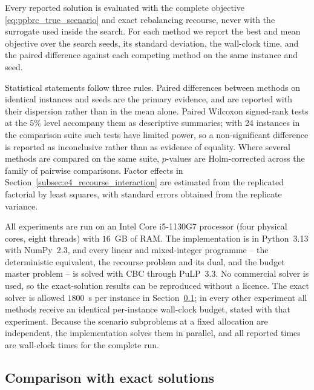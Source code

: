 \documentclass[authoryear,final,3p,times]{elsarticle}
\theoremstyle{definition}
\theoremstyle{plain}
\begin{document}
Every reported solution is evaluated with the complete objective
\eqref{eq:ppbrc_true_scenario} and exact rebalancing recourse, never with the
surrogate used inside the search.  For each method we report the best and mean
objective over the search seeds, its standard deviation, the wall-clock time,
and the paired difference against each competing method on the same instance
and seed.

Statistical statements follow three rules.  Paired differences between methods
on identical instances and seeds are the primary evidence, and are reported
with their dispersion rather than in the mean alone.  Paired Wilcoxon
signed-rank tests at the $5\%$ level accompany them as descriptive summaries;
with 24 instances in the comparison suite such tests have limited power, so a
non-significant difference is reported as inconclusive rather than as evidence
of equality.  Where several methods are compared on the same suite, $p$-values
are Holm-corrected across the family of pairwise comparisons.  Factor effects
in Section~\ref{subsec:e4_recourse_interaction} are estimated from the
replicated factorial by least squares, with standard errors obtained from the
replicate variance.

All experiments are run on an Intel Core i5-1130G7 processor (four physical
cores, eight threads) with $16$~GB of RAM.  The implementation is in
Python~3.13 with NumPy~2.3, and every linear and mixed-integer programme --
the deterministic equivalent, the recourse problem and its dual, and the
budget master problem -- is solved with CBC through PuLP~3.3.  No commercial
solver is used, so the exact-solution results can be reproduced without a
licence.  The exact solver is allowed $1800$~s per instance in
Section~\ref{subsec:e1_verification}; in every other experiment all methods
receive an identical per-instance wall-clock budget, stated with that
experiment.  Because the scenario subproblems at a fixed allocation are
independent, the implementation solves them in parallel, and all reported
times are wall-clock times for the complete run.

\subsection{Comparison with exact solutions}
\label{subsec:e1_verification}
\end{document}
